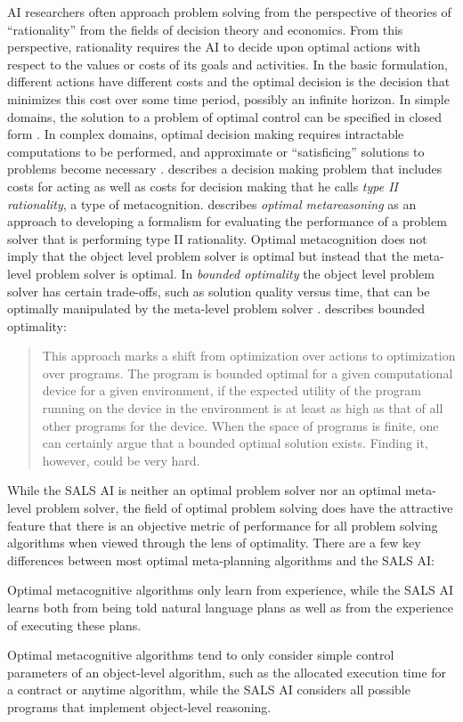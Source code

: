 AI researchers often approach problem solving from the perspective of
theories of ``rationality'' from the fields of decision theory and
economics.  From this perspective, rationality requires the AI to
decide upon optimal actions with respect to the values or costs of its
goals and activities.  In the basic formulation, different actions
have different costs and the optimal decision is the decision that
minimizes this cost over some time period, possibly an infinite
horizon.  In simple domains, the solution to a problem of optimal
control can be specified in closed form \cite[]{bertsekas:1995}.  In
complex domains, optimal decision making requires intractable
computations to be performed, and approximate or ``satisficing''
solutions to problems become necessary \cite[]{simon:1957,simon:1982}.
\cite{good:1971} describes a decision making problem that includes
costs for acting as well as costs for decision making that he calls
{\emph{type II rationality}}, a type of metacognition.
\cite{zilberstein:2011} describes {\emph{optimal metareasoning}} as an
approach to developing a formalism for evaluating the performance of a
problem solver that is performing type II rationality.  Optimal
metacognition does not imply that the object level problem solver is
optimal but instead that the meta-level problem solver is optimal.  In
{\emph{bounded optimality}} the object level problem solver has
certain trade-offs, such as solution quality versus time, that can be
optimally manipulated by the meta-level problem solver
\cite[]{russell:1991}.  \cite{zilberstein:2011} describes bounded
optimality:
\begin{quote}
This approach marks a shift from optimization over actions to
optimization over programs.  The program is bounded optimal for a
given computational device for a given environment, if the expected
utility of the program running on the device in the environment is at
least as high as that of all other programs for the device.  When the
space of programs is finite, one can certainly argue that a bounded
optimal solution exists.  Finding it, however, could be very hard.
\end{quote}
While the SALS AI is neither an optimal problem solver nor an optimal
meta-level problem solver, the field of optimal problem solving does
have the attractive feature that there is an objective metric of
performance for all problem solving algorithms when viewed through the
lens of optimality.  There are a few key differences between most
optimal meta-planning algorithms and the SALS AI:
\begin{packed_enumerate}
\item{Optimal metacognitive algorithms only learn from experience,
  while the SALS AI learns both from being told natural language plans
  as well as from the experience of executing these plans.}
\item{Optimal metacognitive algorithms tend to only consider simple
  control parameters of an object-level algorithm, such as the
  allocated execution time for a contract or anytime algorithm, while
  the SALS AI considers all possible programs that implement
  object-level reasoning.}
\end{packed_enumerate}
